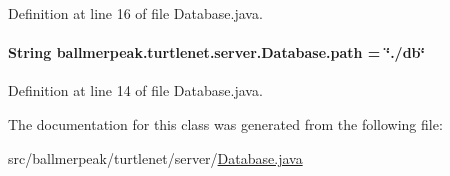 Definition at line 16 of file Database.\-java.

\hypertarget{classballmerpeak_1_1turtlenet_1_1server_1_1Database_a3933689115f43166439d740b2a254481}{
\paragraph[{path}]{\setlength{\rightskip}{0pt plus 5cm}String ballmerpeak.\-turtlenet.\-server.\-Database.\-path = \char`\"{}./db\char`\"{}\hspace{0.3cm}{\ttfamily [static]}}}\label{classballmerpeak_1_1turtlenet_1_1server_1_1Database_a3933689115f43166439d740b2a254481}


Definition at line 14 of file Database.\-java.



The documentation for this class was generated from the following file\-:\begin{DoxyCompactItemize}
\item 
src/ballmerpeak/turtlenet/server/\hyperlink{Database_8java}{Database.\-java}\end{DoxyCompactItemize}
